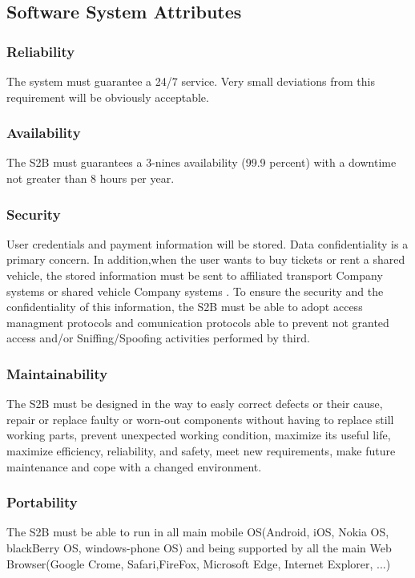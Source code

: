 \subsection{Software System Attributes} 
	\subsubsection{Reliability}
	The system must guarantee a 24/7 service. Very small deviations from this requirement will be
	obviously acceptable.
	\subsubsection{Availability}
	The S2B must guarantees a 3-nines availability (99.9 percent) with a downtime not greater than 8 hours per year.
	\subsubsection{Security}
User credentials and payment information will be stored. Data confidentiality is a primary concern.
In addition,when the user wants to buy tickets or rent a shared vehicle, the stored information must be sent to affiliated  transport Company systems or shared vehicle Company  systems . To ensure the security and the confidentiality of this information, the S2B must be able to adopt  access managment protocols and comunication protocols able to prevent not granted access and/or Sniffing/Spoofing activities performed by third.
	
	\subsubsection{Maintainability}
	The S2B must be designed in the way to easly correct defects or their cause,
	repair or replace faulty or worn-out components without having to replace still working parts,
	prevent unexpected working condition,
	maximize its useful life,
	maximize efficiency, reliability, and safety,
	meet new requirements,
	make future maintenance and
	cope with a changed environment.
	
	\subsubsection{Portability}
	The S2B must be able to run in all main mobile OS(Android, iOS, Nokia OS, blackBerry OS, windows-phone OS) and being supported by all the main Web Browser(Google Crome, Safari,FireFox, Microsoft Edge, Internet Explorer, ...)\newline
	
